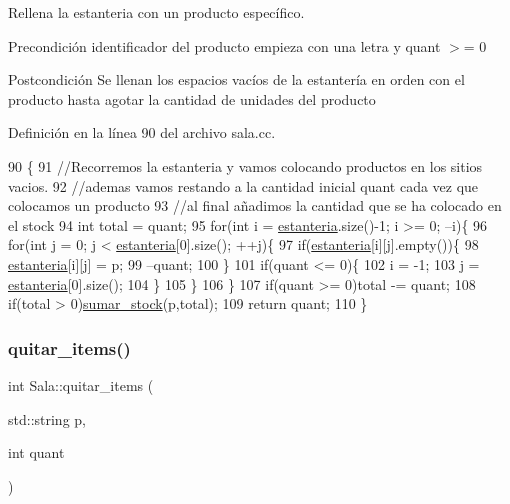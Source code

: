 Rellena la estanteria con un producto específico. 

\begin{DoxyPrecond}{Precondición}
identificador del producto empieza con una letra y quant $>$= 0 
\end{DoxyPrecond}
\begin{DoxyPostcond}{Postcondición}
Se llenan los espacios vacíos de la estantería en orden con el producto hasta agotar la cantidad de unidades del producto 
\end{DoxyPostcond}


Definición en la línea 90 del archivo sala.\+cc.


\begin{DoxyCode}
90                                          \{
91     \textcolor{comment}{//Recorremos la estanteria y vamos colocando productos en los sitios vacios.}
92     \textcolor{comment}{//ademas vamos restando a la cantidad inicial quant cada vez que colocamos un producto}
93     \textcolor{comment}{//al final añadimos la cantidad que se ha colocado en el stock }
94     \textcolor{keywordtype}{int} total = quant; 
95     \textcolor{keywordflow}{for}(\textcolor{keywordtype}{int} i = \mbox{\hyperlink{class_sala_a8f5264818c98db9c0d075c51a7672d95}{estanteria}}.size()-1; i >= 0; --i)\{
96         \textcolor{keywordflow}{for}(\textcolor{keywordtype}{int} j = 0; j < \mbox{\hyperlink{class_sala_a8f5264818c98db9c0d075c51a7672d95}{estanteria}}[0].size(); ++j)\{
97             \textcolor{keywordflow}{if}(\mbox{\hyperlink{class_sala_a8f5264818c98db9c0d075c51a7672d95}{estanteria}}[i][j].empty())\{
98                 \mbox{\hyperlink{class_sala_a8f5264818c98db9c0d075c51a7672d95}{estanteria}}[i][j] = p;
99                 --quant;
100             \}
101             \textcolor{keywordflow}{if}(quant <= 0)\{
102                 i = -1;
103                 j = \mbox{\hyperlink{class_sala_a8f5264818c98db9c0d075c51a7672d95}{estanteria}}[0].size();
104             \}  
105         \}
106     \}      
107     \textcolor{keywordflow}{if}(quant >= 0)total -= quant;
108     \textcolor{keywordflow}{if}(total > 0)\mbox{\hyperlink{class_sala_a91e0acab4f56f3a5cbcad80afe163de8}{sumar\_stock}}(p,total);
109     \textcolor{keywordflow}{return} quant;
110 \}
\end{DoxyCode}
\mbox{\label{class_sala_afcdc6c283e5fca9632f279142ad613c3}} 
\subsubsection{\texorpdfstring{quitar\+\_\+items()}{quitar\_items()}}
{\footnotesize\ttfamily int Sala\+::quitar\+\_\+items (\begin{DoxyParamCaption}\item[{std\+::string}]{p,  }\item[{int}]{quant }\end{DoxyParamCaption})}




